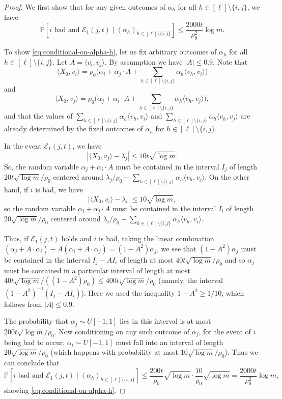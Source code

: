 \documentclass[reqno]{amsart}
\theoremstyle{remark}
\theoremstyle{definition}
\numberwithin{theorem}{section}
\renewcommand{\(}{\bigl(}
\renewcommand{\)}{\bigr)\vphantom{)}}
\newcommand{\cE}{\mathcal E}
\renewcommand{\le}{\leqslant}
\renewcommand{\ge}{\geqslant}
\renewcommand{\P}{\mathbb{P}}
\newcommand{\ang}[1]{\langle#1\rangle}
\begin{document}
\begin{proof}
We first show that for any given outcomes of $\alpha_h$ for all $h\in [\ell]\setminus\{i,j\}$, we have
\begin{equation}\label{eq:conditional-on-alpha-h}
\P[i\text{ bad}\text{ and }\cE_1(j,t) \mid (\alpha_h)_{h\in [\ell]\setminus\{i,j\}}]\le  \frac{2000t}{\rho_0^2}\log m.
\end{equation}

To show \eqref{eq:conditional-on-alpha-h}, let us fix arbitrary outcomes of $\alpha_h$ for all $h\in [\ell]\setminus\{i,j\}$. Let $A = \ang{v_i, v_j}$. By assumption we have $|A|\le 0.9$. Note that 
\[\ang{X_0, v_i} = \rho_0\Big(\alpha_i + \alpha_j\cdot A + \sum_{h \in [\ell]\setminus\{i,j\}}\alpha_h\ang{v_h, v_i}\Big)\]
and 
\[\ang{X_0, v_j} = \rho_0\Big(\alpha_j + \alpha_i\cdot A + \sum_{h \in [\ell]\setminus\{i,j\}}\alpha_h\ang{v_h, v_j}\Big),\]
and that the values of $\sum_{h \in [\ell]\setminus\{i,j\}}\alpha_h\ang{v_h, v_i}$ and $\sum_{h \in [\ell]\setminus\{i,j\}}\alpha_h\ang{v_h, v_j}$ are already determined by the fixed outcomes of $\alpha_h$ for $h\in [\ell]\setminus\{i,j\}$.

In the event $\cE_1(j,t)$, we have
\[|\ang{X_0,v_j} - \lambda_j|\le 10t\sqrt{\log m}.\]
So, the random variable $\alpha_j + \alpha_i\cdot A$ must be contained in the interval $I_j$ of length $20t\sqrt{\log m}/\rho_0$ centered around $\lambda_j/\rho_0 - \sum_{h \in [\ell]\setminus\{i,j\}}\alpha_h\ang{v_h, v_j}$. On the other hand, if $i$ is bad, we have 
\[|\ang{X_0, v_i} - \lambda_i| \le 10\sqrt{\log m},\]
so the random variable $\alpha_i + \alpha_j\cdot A$ must be contained in the interval $I_i$ of length $20\sqrt{\log m}/\rho_0$ centered around $\lambda_i/\rho_0 - \sum_{h \in [\ell]\setminus\{i,j\}}\alpha_h\ang{v_h, v_i}$. 

Thus, if $\cE_1(j,t)$ holds and $i$ is bad, taking the linear combination $(\alpha_j + A\cdot \alpha_i) - A(\alpha_i + A\cdot \alpha_j) = (1- A^2 )\alpha_j$, we see that $(1- A^2 )\alpha_j$ must be contained in the interval $I_j-AI_i$ of length at most $40t\sqrt{\log m}/\rho_0$ and so $\alpha_j$ must be contained in a particular interval of length at most $40t\sqrt{\log m}/((1-A^2)\rho_0)\le 400t\sqrt{\log m}/\rho_0$ (namely, the interval $(1- A^2 )^{-1}(I_j-AI_i)$). Here we used the inequality $1-A^2\ge 1/10$, which follows from $|A|\le 0.9$.

The probability that $\alpha_j\sim U[-1,1]$ lies in this interval is at most $200t\sqrt{\log m}/\rho_0$. Now conditioning on any such outcome of $\alpha_j$, for the event of $i$ being bad to occur, $\alpha_i\sim U[-1,1]$ must fall into an interval of length $20\sqrt{\log m}/\rho_0$ (which happens with probability at most $10\sqrt{\log m}/\rho_0$). Thus we can conclude that 
\[\P[i\text{ bad}\text{ and }\cE_1(j,t)\mid (\alpha_h)_{h\in [\ell]\setminus\{i,j\}}]\le  \frac{200t}{\rho_0}\sqrt{\log m}\cdot \frac{10}{\rho_0}\sqrt{\log m}=\frac{2000t}{\rho_0^2}\log m,\]
showing \eqref{eq:conditional-on-alpha-h}.


\end{proof}
\end{document}
